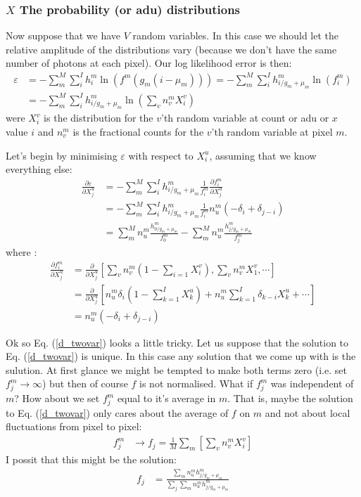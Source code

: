 \documentclass[11pt]{article}
\begin{document}
\subsubsection{$X$ The probability (or adu) distributions}
Now suppose that we have $V$ random variables. In this case we should let the relative amplitude of the distributions vary (because we don't have the same number of photons at each pixel). Our log likelihood error is then:
\begin{align}
   \varepsilon &= -\sum_m^M \sum_i^I h^m_i \ln(f^m(g_m(i - \mu_m))) = -\sum_m^M \sum_i^I h^m_{i/g_m+\mu_m} \ln(f^m_i) \\
   &= -\sum_m^M \sum_i^I h^m_{i/g_m+\mu_m} \ln\left(\sum_v n^m_v X^v_i\right)
\end{align}
were $X^v_i$ is the distribution for the $v$'th random variable at count or adu or $x$ value $i$ and $n^m_v$ is the fractional counts for the $v$'th random variable at pixel $m$. 

Let's begin by minimising $\varepsilon$ with respect to $X^u_i$, assuming that we know everything else:
\begin{align}
   \frac{\partial \varepsilon}{\partial X^u_j} &= -\sum_m^M \sum_i^I h^m_{i/g_m+\mu_m} \frac{1}{f^m_i} \frac{\partial f^m_i}{\partial X^u_j} \\
   &= - \sum_m^M \sum_i^I h^m_{i/g_m+\mu_m} \frac{1}{f^m_i}n^m_u(-\delta_{i} + \delta_{j-i}) \\
   &=  \sum_m^M n^m_u \frac{ h^m_{0/g_m+\mu_m}}{f^m_0}- \sum_m^M n^m_u \frac{ h^m_{j/g_m+\mu_m}}{f^m_j} 
   \label{d_twovar}
\end{align}
where :
\begin{align}
   \frac{\partial f^m_i}{\partial X^u_j} &= \frac{\partial }{\partial X^u_j} \left[ \sum_v n^m_v (1- \sum_{i=1} X^v_i), \sum_v n^m_v X^v_1, \cdots \right]\\
   &= \frac{\partial }{\partial X^u_j} \left[ n^m_u \delta_{i} (1 - \sum_{k=1}^I X^u_k) + n^m_u\sum_{k=1}^I \delta_{k-i} X^u_k + \cdots \right] \\
   &= n^m_u(-\delta_{i} + \delta_{j-i}) 
\end{align}

Ok so Eq. (\ref{d_twovar}) looks a little tricky. Let us suppose that the solution to Eq. (\ref{d_twovar}) is unique. In this case any solution that we come up with is the sulution. At first glance we might be tempted to make both terms zero (i.e. set $f^m_j \rightarrow \infty$) but then of course $f$ is not normalised. What if $f^m_j$ was independent of $m$? How about we set $f^m_j$ equal to it's average in $m$. That is, maybe the solution to Eq. (\ref{d_twovar}) only cares about the average of $f$ on $m$ and not about local fluctuations from pixel to pixel:
\begin{align}
   f^m_j &\rightarrow f_j = \frac{1}{M}\sum_m \left[ \sum_v n^m_v X^v_i \right] 
\end{align}
I possit that this might be the solution:
\begin{align}
   f_j &= \frac{\sum_m n^m_u h^m_{j/g_m+\mu_m}}{\sum_{j}\sum_m n^m_u h^m_{j/g_m+\mu_m}}
\end{align}
\end{document}
